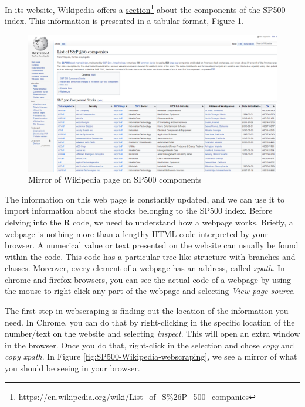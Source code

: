 \documentclass[
  12pt,
]{book}
\begin{document}
In its website, Wikipedia offers a \href{https://en.wikipedia.org/wiki/List_of_S\%26P_500_companies}{section}\footnote{\url{https://en.wikipedia.org/wiki/List_of_S\%26P_500_companies}} about the components of the SP500 index. This information is presented in a tabular format, Figure \ref{fig:SP500-wikipedia}.

\begin{figure}[!htbp]

{\centering \includegraphics[width=0.75\linewidth]{figs/SP500-Wikipedia} 

}

\caption{Mirror of Wikipedia page on SP500 components}\label{fig:SP500-wikipedia}
\end{figure}

The information on this web page is constantly updated, and we can use it to import information about the stocks belonging to the SP500 index. Before delving into the R code, we need to understand how a webpage works. Briefly, a webpage is nothing more than a lengthy HTML code interpreted by your browser. A numerical value or text presented on the website can usually be found within the code. This code has a particular tree-like structure with branches and classes. Moreover, every element of a webpage has an address, called \emph{xpath}. In chrome and firefox browsers, you can see the actual code of a webpage by using the mouse to right-click any part of the webpage and selecting \emph{View page source}.

The first step in webscraping is finding out the location of the information you need. In Chrome, you can do that by right-clicking in the specific location of the number/text on the website and selecting \emph{inspect}. This will open an extra window in the browser. Once you do that, right-click in the selection and chose \emph{copy} and \emph{copy xpath}. In Figure \ref{fig:SP500-Wikipedia-webscraping}, we see a mirror of what you should be seeing in your browser.
\end{document}
